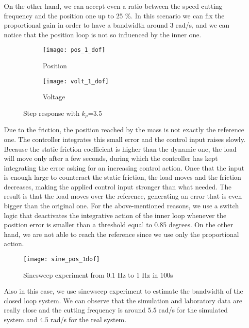 On the other hand, we can accept even a ratio between the speed cutting frequency and the position one up to 25 \%. In this scenario we can fix the proportional gain in order to have a bandwidth around 3 rad/s, and we can notice that the position loop is not so influenced by the inner one.


\begin{figure*}[h]
	\centering
	\begin{subfigure}{0.45\columnwidth}
		\texttt{[image: pos\_1\_dof]}
		\caption{Position}
	\end{subfigure}
	\begin{subfigure}{0.45\columnwidth}
		\texttt{[image: volt\_1\_dof]}
		\caption{Voltage}
	\end{subfigure}
	\caption{Step response with $k_{p} $=3.5}
	\label{fig:Pos_1dof_3.5}
\end{figure*}

Due to the friction, the position reached by the mass is not exactly the reference one. The controller integrates this small error and the control input raises slowly. Because the static friction coefficient is higher than the dynamic one, the load will move only after a few seconds, during which the controller has kept integrating the error asking for an increasing control action.
Once that the input is enough large to counteract the static friction, the load moves and the friction decreases, making the applied control input stronger than what needed. The result is that the load moves over the reference, generating an error that is even bigger than the original one.
For the above-mentioned reasons, we use a switch logic that deactivates the integrative action of the inner loop whenever the position error is smaller than a threshold equal to 0.85 degrees. On the other hand, we are not able to reach the reference since we use only the proportional action.

\begin{figure*}[h]
	\centering
	\texttt{[image: sine\_pos\_1dof]}
	\caption{Sinesweep experiment from 0.1 Hz to 1 Hz in 100s}
	\label{fig:sinesweep_pos_1dof}
\end{figure*}

Also in this case, we use sinewseep experiment to estimate the bandwidth of the closed loop system. We can observe that the simulation and laboratory data are really close and the cutting frequency is around 5.5 rad/s for the simulated system and 4.5 rad/s for the real system.

\newpage
